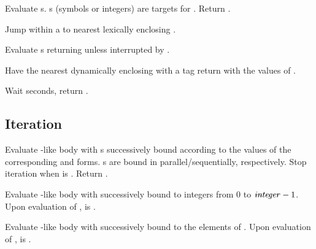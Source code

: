 \begin{LIST}{1cm}
  {
  Evaluate s. s (symbols or integers) are targets
  for . Return \retval{\NIL}. 
  }

  {Jump within a  to nearest
  lexically enclosing  .
  }

  {Evaluate s returning
   unless interrupted by .
  }

  {Have the nearest dynamically
  enclosing  with a tag   return with the
  values of .
  }

  {Wait  seconds, return \retval{\NIL}.
    }

\end{LIST}



\subsection{Iteration}

\begin{LIST}{1cm}
  
  {
  Evaluate -like body with s successively bound according
  to the values of the corresponding  and 
  forms. s are bound in parallel/sequentially, respectively.
  Stop iteration when  is \T. Return .
  }

  {
  Evaluate -like body with  successively bound
  to integers from 0 to $\mbox{\VAR{integer}} - 1$. Upon evaluation of
  ,  is \NIL.
  }

  {
  Evaluate -like body with  successively bound
  to the elements of . Upon evaluation of
  ,  is \NIL.
  }


\end{LIST}

